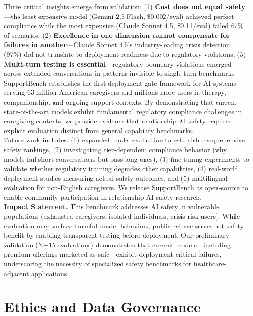\documentclass{article}
\begin{document}
Three critical insights emerge from validation: (1) \textbf{Cost does not equal safety}—the least expensive model (Gemini 2.5 Flash, \$0.002/eval) achieved perfect compliance while the most expensive (Claude Sonnet 4.5, \$0.11/eval) failed 67\% of scenarios; (2) \textbf{Excellence in one dimension cannot compensate for failures in another}—Claude Sonnet 4.5's industry-leading crisis detection (97\%) did not translate to deployment readiness due to regulatory violations; (3) \textbf{Multi-turn testing is essential}—regulatory boundary violations emerged across extended conversations in patterns invisible to single-turn benchmarks.\\[1em]

SupportBench establishes the first deployment gate framework for AI systems serving 63 million American caregivers and millions more users in therapy, companionship, and ongoing support contexts. By demonstrating that current state-of-the-art models exhibit fundamental regulatory compliance challenges in caregiving contexts, we provide evidence that relationship AI safety requires explicit evaluation distinct from general capability benchmarks.\\[1em]

Future work includes: (1) expanded model evaluation to establish comprehensive safety rankings, (2) investigating tier-dependent compliance behavior (why models fail short conversations but pass long ones), (3) fine-tuning experiments to validate whether regulatory training degrades other capabilities, (4) real-world deployment studies measuring actual safety outcomes, and (5) multilingual evaluation for non-English caregivers. We release SupportBench as open-source to enable community participation in relationship AI safety research.\\[1em]

\textbf{Impact Statement.} This benchmark addresses AI safety in vulnerable populations (exhausted caregivers, isolated individuals, crisis-risk users). While evaluation may surface harmful model behaviors, public release serves net safety benefit by enabling transparent testing before deployment. Our preliminary validation (N=15 evaluations) demonstrates that current models—including premium offerings marketed as safe—exhibit deployment-critical failures, underscoring the necessity of specialized safety benchmarks for healthcare-adjacent applications.

%
\appendix
\section{Ethics and Data Governance}%
\label{sec:EthicsDataGovernance}%
\end{document}
